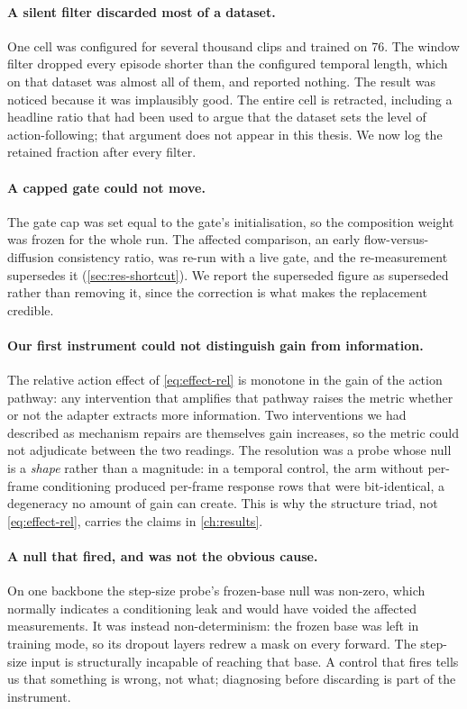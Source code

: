 \paragraph{A silent filter discarded most of a dataset.} One cell was
configured for several thousand clips and trained on \num{76}. The window
filter dropped every episode shorter than the configured temporal length,
which on that dataset was almost all of them, and reported nothing. The
result was noticed because it was implausibly good. The entire cell is
retracted, including a headline ratio that had been used to argue that the
dataset sets the level of action-following; that argument does not appear in
this thesis. We now log the retained fraction after every filter.

\paragraph{A capped gate could not move.} The gate cap was set equal to the
gate's initialisation, so the composition weight was frozen for the whole
run. The affected comparison, an early flow-versus-diffusion consistency
ratio, was re-run with a live gate, and the re-measurement supersedes it
(\cref{sec:res-shortcut}). We report the superseded figure as superseded
rather than removing it, since the correction is what makes the replacement
credible.

\paragraph{Our first instrument could not distinguish gain from
information.} The relative action effect of \cref{eq:effect-rel} is monotone
in the gain of the action pathway: any intervention that amplifies that
pathway raises the metric whether or not the adapter extracts more
information. Two interventions we had described as mechanism repairs are
themselves gain increases, so the metric could not adjudicate between the
two readings. The resolution was a probe whose null is a \emph{shape} rather
than a magnitude: in a temporal control, the arm without per-frame
conditioning produced per-frame response rows that were bit-identical, a
degeneracy no amount of gain can create. This is why the structure triad,
not \cref{eq:effect-rel}, carries the claims in \cref{ch:results}.

\paragraph{A null that fired, and was not the obvious cause.} On one
backbone the step-size probe's frozen-base null was non-zero, which normally
indicates a conditioning leak and would have voided the affected
measurements. It was instead non-determinism: the frozen base was left in
training mode, so its dropout layers redrew a mask on every forward. The
step-size input is structurally incapable of reaching that base. A control
that fires tells us that something is wrong, not what; diagnosing before
discarding is part of the instrument.

